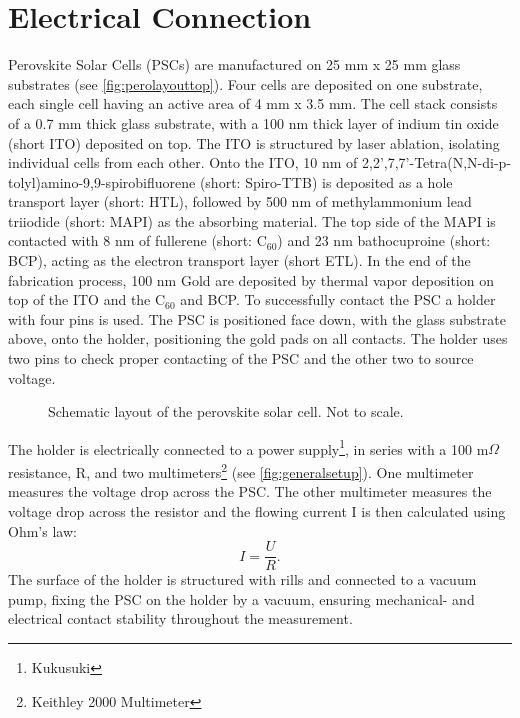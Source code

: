 \section{Electrical Connection}\label{sec:electricalconnection}
Perovskite Solar Cells (PSCs) are manufactured on 25 mm x 25 mm glass substrates (see \autoref{fig:perolayouttop}). Four cells are deposited on one substrate, each single cell having an active area of 4 mm x 3.5 mm. The cell stack consists of a 0.7 mm thick glass substrate, with a 100 nm thick layer of indium tin oxide (short ITO) deposited on top. The ITO is structured by laser ablation, isolating individual cells from each other. Onto the ITO, 10 nm of 2,2',7,7'-Tetra(N,N-di-p-tolyl)amino-9,9-spirobifluorene (short: Spiro-TTB) is deposited as a hole transport layer (short: HTL), followed by 500 nm of methylammonium lead triiodide (short: MAPI) as the absorbing material. The top side of the MAPI is contacted with 8 nm of fullerene (short: C$_{60}$) and 23 nm bathocuproine (short: BCP), acting as the electron transport layer (short ETL). In the end of the fabrication process, 100 nm Gold are deposited by thermal vapor deposition on top of the ITO and the C$_{60}$ and BCP. To successfully contact the PSC a holder with four pins is used. The PSC is positioned face down, with the glass substrate above, onto the holder, positioning the gold pads on all contacts. The holder uses two pins to check proper contacting of the PSC and the other two to source voltage.

\begin{figure}
	\centering
	
	\caption{Schematic layout of the perovskite solar cell. Not to scale.}
	\label{fig:perolayouttop}
\end{figure}

The holder is electrically connected to a power supply\footnote{Kukusuki}, in series with a 100 m$\Omega$ resistance, R, and two multimeters\footnote{Keithley 2000 Multimeter} (see \autoref{fig:generalsetup}). One multimeter measures the voltage drop across the PSC. The other multimeter measures the voltage drop across the resistor and the flowing current I is then calculated using Ohm's law:
\begin{equation}
	I = \frac{U}{R}.
\end{equation}
The surface of the holder is structured with rills and connected to a vacuum pump, fixing the PSC on the holder by a vacuum, ensuring mechanical- and electrical contact stability throughout the measurement.

